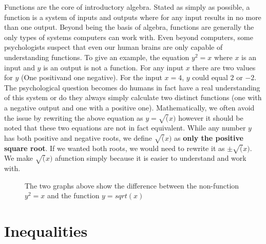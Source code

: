 \documentclass{article}
\begin{document}
\indent Functions are the core of introductory algebra. Stated as simply as possible, a function is a system of inputs and outputs where for any input results in no more than one output. 
\bigskip
\indent Beyond being the basis of algebra, functions are generally the only types of systems computers can work with. Even beyond computers, some psychologists suspect that even our human brains are only capable of understanding functions.
\bigskip
To give an example, the equation $y^2=x$ where $x$ is an input and $y$ is an output is not a function. For any input $x$ there are two values for $y$ (One positivand one negative). For the input $x=4$, $y$ could equal $2$ or $-2$.
\bigskip
\indent The psychological question becomes do humans in fact have a real understanding of this system or do they always simply calculate two distinct functions (one with a negative output and one with a positive one). 
\bigskip
\indent Mathematically, we often avoid the issue by rewriting the above equation as $y=\sqrt(x)$ however it should be noted that these two equations are not in fact equivalent. While any number $y$ has both positive and negative roots, we define $\sqrt(x)$ as \textbf{only the positive square root}. If we wanted both roots, we would need to rewrite it as $\pm\sqrt(x)$. We make $\sqrt(x)$ afunction simply because it is easier to understand and work with.
\begin{figure}[!htb]
\qquad
	\caption{The two graphs above show the difference between the non-function $y^2=x$ and the function $y=sqrt(x)$}
\end{figure}

\bigskip
\section{Inequalities}
\end{document}
